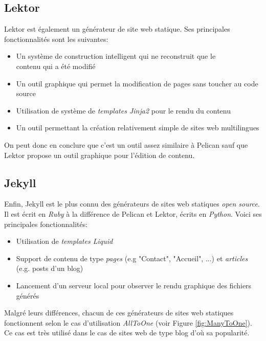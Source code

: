 	\subsection*{Lektor}
	Lektor \cite{Lektor} est également un générateur de site web statique. Ses principales fonctionnalités sont les suivantes:
	
	\begin{itemize}
		\item Un système de construction intelligent qui ne reconstruit que le \\contenu qui a été modifié
		\item Un outil graphique qui permet la modification de pages sans toucher au code source
		\item Utilisation de système de \textit{templates Jinja2} pour le rendu du contenu
		\item Un outil permettant la création relativement simple de sites web multilingues
	\end{itemize}
	
	On peut donc en conclure que c'est un outil assez similaire à Pelican sauf que Lektor propose un outil graphique pour l'édition de contenu.
	
	\subsection*{Jekyll}
	Enfin, Jekyll \cite{Jekyll} est le plus connu des générateurs de sites web statiques \textit{open source}. Il est écrit en \textit{Ruby} à la différence de Pelican et Lektor, écrits en \textit{Python}. Voici ses principales fonctionnalités:
	
	\begin{itemize}
		\item Utilisation de \textit{templates Liquid}
		\item Support de contenu de type \textit{pages} (e.g "Contact", "Accueil", ...) et \textit{articles} (e.g. posts d'un blog)
		\item Lancement d'un serveur local pour observer le rendu graphique des fichiers générés\\
	\end{itemize}
	
	Malgré leurs différences, chacun de ces générateurs de sites web statiques fonctionnent selon le cas d'utilisation \textit{AllToOne} (voir Figure \ref{fig:ManyToOne}). Ce cas est très utilisé dans le cas de sites web de type blog d'où sa popularité.